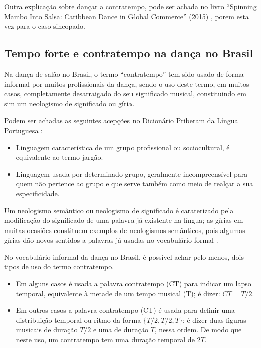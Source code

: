Outra explicação sobre dançar a contratempo, pode ser achada
no livro ``Spinning Mambo Into Salsa: Caribbean Dance in Global Commerce'' (2015) \cite[pp. 68]{mcmains2015spinning},
porem esta vez para o caso sincopado. 


\subsection{Tempo forte e contratempo na dança no Brasil}
\label{subsec:contratempobrasil}
Na dança de salão no Brasil, 
o termo ``contratempo'' tem sido usado de forma informal por muitos profissionais da dança,
sendo o uso deste termo, em muitos casos, completamente desarraigado do seu significado musical,
constituindo em sim um neologismo de significado ou gíria.

\begin{definition}[Gíria:] 
\label{def:Giria}
Podem ser achadas as seguintes acepções no Dicionário Priberam da Língua Portuguesa \cite{priberamgiria}:
\begin{itemize}
\item Linguagem característica de um grupo profissional ou sociocultural, é equivalente ao termo jargão.
\item Linguagem usada por determinado grupo, 
geralmente incompreensível para quem não pertence ao grupo e que serve também como meio de realçar a sua especificidade.
\end{itemize}
\end{definition}

\begin{definition} 
\label{def:NeologismoSemantico}
Um neologismo semântico ou neologismo de significado é caraterizado pela modificação do significado de uma palavra já existente na língua;
as gírias em muitas ocasiões constituem exemplos de neologismos semânticos, 
pois algumas gírias dão novos sentidos a palavras já usadas no vocabulário formal \cite[pp. 82-83]{correalingua}.
\end{definition}

No vocabulário informal da dança no Brasil,
é possível achar pelo menos, dois tipos de uso do termo contratempo.
\begin{itemize}
\item Em alguns casos é usada a palavra contratempo (CT) para indicar um lapso temporal, 
equivalente à metade de um tempo musical (T); é dizer: $CT=T/2$.
\item Em outros casos a palavra contratempo (CT) é usada para definir uma distribuição temporal 
ou ritmo da forma $\{T/2, T/2, T\}$; é dizer duas figuras musicais de duração $T/2$ e uma de duração $T$,
nessa ordem. De modo que neste uso, um contratempo tem uma duração temporal de $2T$. 
\end{itemize}

